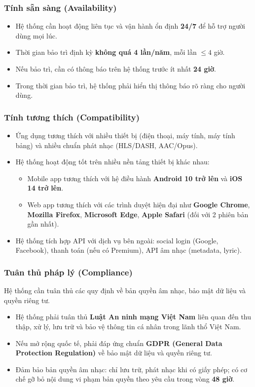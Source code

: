 \documentclass[a4paper]{article}
\begin{document}
\subsubsection{Tính sẵn sàng (Availability)}
\begin{itemize}
	\item Hệ thống cần hoạt động liên tục và vận hành ổn định \textbf{24/7} để hỗ trợ người dùng mọi lúc.
	\item Thời gian bảo trì định kỳ \textbf{không quá 4 lần/năm}, mỗi lần $\leq 4$ giờ.
	\item Nếu bảo trì, cần có thông báo trên hệ thống trước ít nhất \textbf{24 giờ}.
	\item Trong thời gian bảo trì, hệ thống phải hiển thị thông báo rõ ràng cho người dùng.
\end{itemize}

\subsubsection{Tính tương thích (Compatibility)}
\begin{itemize}
	\item Ứng dụng tương thích với nhiều thiết bị (điện thoại, máy tính, máy tính bảng) và nhiều chuẩn phát nhạc (HLS/DASH, AAC/Opus).
	\item Hệ thống hoạt động tốt trên nhiều nền tảng thiết bị khác nhau:
	      \begin{itemize}
		      \item Mobile app tương thích với hệ điều hành \textbf{Android 10 trở lên} và \textbf{iOS 14 trở lên}.
		      \item Web app tương thích với các trình duyệt hiện đại như \textbf{Google Chrome}, \textbf{Mozilla Firefox}, \textbf{Microsoft Edge}, \textbf{Apple Safari} (đối với 2 phiên bản gần nhất).
	      \end{itemize}
	\item Hệ thống tích hợp API với dịch vụ bên ngoài: social login (Google, Facebook), thanh toán (nếu có Premium), API âm nhạc (metadata, lyric).
\end{itemize}

\subsubsection{Tuân thủ pháp lý (Compliance)}
Hệ thống cần tuân thủ các quy định về bản quyền âm nhạc, bảo mật dữ liệu và quyền riêng tư.
\begin{itemize}
	\item Hệ thống phải tuân thủ \textbf{Luật An ninh mạng Việt Nam} liên quan đến thu thập, xử lý, lưu trữ và bảo vệ thông tin cá nhân trong lãnh thổ Việt Nam.
	\item Nếu mở rộng quốc tế, phải đáp ứng chuẩn \textbf{GDPR (General Data Protection Regulation)} về bảo mật dữ liệu và quyền riêng tư.
	\item Đảm bảo bản quyền âm nhạc: chỉ lưu trữ, phát nhạc khi có giấy phép; có cơ chế gỡ bỏ nội dung vi phạm bản quyền theo yêu cầu trong vòng \textbf{48 giờ}.
\end{itemize}
\end{document}
